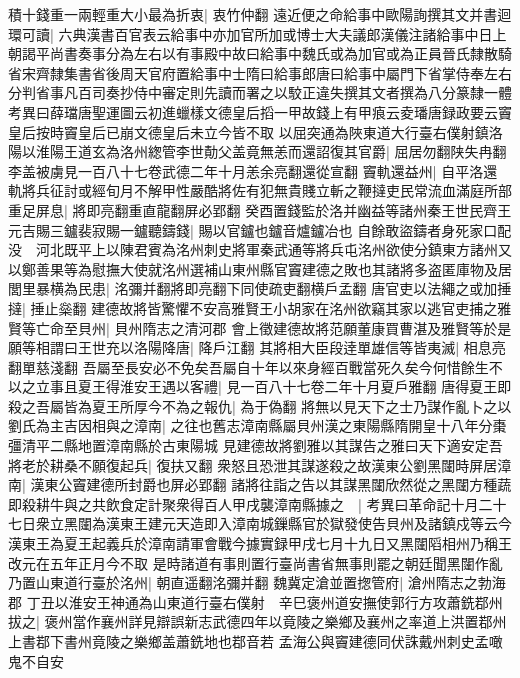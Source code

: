 積十錢重一兩輕重大小最為折衷|{
	衷竹仲翻}
遠近便之命給事中歐陽詢撰其文并書迴環可讀|{
	六典漢書百官表云給事中亦加官所加或博士大夫議郎漢儀注諸給事中日上朝謁平尚書奏事分為左右以有事殿中故曰給事中魏氏或為加官或為正員晉氏隸散騎省宋齊隸集書省後周天官府置給事中士隋曰給事郎唐曰給事中屬門下省掌侍奉左右分判省事凡百司奏抄侍中審定則先讀而署之以駮正違失撰其文者撰為八分篆隸一體　考異曰薛璫唐聖運圖云初進蠟樣文德皇后搯一甲故錢上有甲㾗云夌璠唐録政要云竇皇后按時竇皇后已崩文德皇后未立今皆不取}
以屈突通為陜東道大行臺右僕射鎮洛陽以淮陽王道玄為洛州緫管李世勣父盖竟無恙而還詔復其官爵|{
	屈居勿翻陕失冉翻李盖被虜見一百八十七卷武德二年十月恙余亮翻還從宣翻}
竇軌還益州|{
	自平洛還}
軌將兵征討或經旬月不解甲性嚴酷將佐有犯無貴賤立斬之鞭撻吏民常流血滿庭所部重足屏息|{
	將即亮翻重直龍翻屏必郢翻}
癸酉置錢監於洛并幽益等諸州秦王世民齊王元吉賜三鑪裴寂賜一鑪聽鑄錢|{
	賜以官鑪也鑪音爐鑪冶也}
自餘敢盜鑄者身死家口配没　河北既平上以陳君賓為洺州刺史將軍秦武通等將兵屯洺州欲使分鎮東方諸州又以鄭善果等為慰撫大使就洺州選補山東州縣官竇建德之敗也其諸將多盗匿庫物及居閭里暴横為民患|{
	洺彌并翻將即亮翻下同使疏吏翻横戶孟翻}
唐官吏以法繩之或加捶撻|{
	捶止橤翻}
建德故將皆驚懼不安高雅賢王小胡家在洺州欲竊其家以逃官吏捕之雅賢等亡命至貝州|{
	貝州隋志之清河郡}
會上徵建德故將范願董康買曹湛及雅賢等於是願等相謂曰王世充以洛陽降唐|{
	降戶江翻}
其將相大臣段逹單雄信等皆夷滅|{
	相息亮翻單慈淺翻}
吾屬至長安必不免矣吾屬自十年以來身經百戰當死久矣今何惜餘生不以之立事且夏王得淮安王遇以客禮|{
	見一百八十七卷二年十月夏戶雅翻}
唐得夏王即殺之吾屬皆為夏王所厚今不為之報仇|{
	為于偽翻}
將無以見天下之士乃謀作亂卜之以劉氏為主吉因相與之漳南|{
	之往也舊志漳南縣屬貝州漢之東陽縣隋開皇十八年分棗彊清平二縣地置漳南縣於古東陽城}
見建德故將劉雅以其謀告之雅曰天下適安定吾將老於耕桑不願復起兵|{
	復扶又翻}
衆怒且恐泄其謀遂殺之故漢東公劉黑闥時屏居漳南|{
	漢東公竇建德所封爵也屏必郢翻}
諸將往詣之告以其謀黑闥欣然從之黑闥方種蔬即殺耕牛與之共飲食定計聚衆得百人甲戌襲漳南縣據之　|{
	考異曰革命記十月二十七日衆立黑闥為漢東王建元天造即入漳南城鏁縣官於獄發使告貝州及諸鎮戍等云今漢東王為夏王起義兵於漳南請軍會戰今據實録甲戌七月十九日又黑闥䧟相州乃稱王改元在五年正月今不取}
是時諸道有事則置行臺尚書省無事則罷之朝廷聞黑闥作亂乃置山東道行臺於洺州|{
	朝直遥翻洺彌并翻}
魏冀定滄並置揔管府|{
	滄州隋志之勃海郡}
丁丑以淮安王神通為山東道行臺右僕射　辛巳褒州道安撫使郭行方攻蕭銑鄀州拔之|{
	褒州當作襄州詳見辯誤新志武德四年以竟陵之樂鄉及襄州之率道上洪置鄀州上書鄀下書州竟陵之樂鄉盖蕭銑地也鄀音若}
孟海公與竇建德同伏誅戴州刺史孟噉鬼不自安

